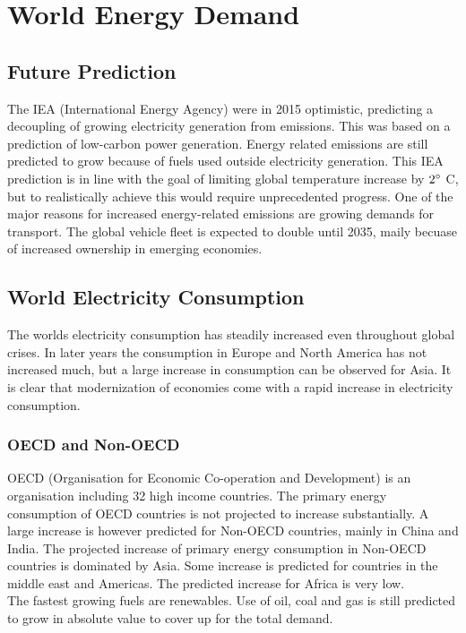 \section{World Energy Demand}

\subsection{Future Prediction}
The IEA (International Energy Agency) were in 2015 optimistic, predicting a decoupling of growing electricity generation from \cotwo emissions.
This was based on a prediction of low-carbon power generation.
Energy related \cotwo emissions are still predicted to grow because of fuels used outside electricity generation.
This IEA prediction is in line with the goal of limiting global temperature increase by $2\degree$ C, but to realistically achieve this would require unprecedented progress.
One of the major reasons for increased energy-related \cotwo emissions are growing demands for transport.
The global vehicle fleet is expected to double until 2035, maily becuase of increased ownership in emerging economies.

\subsection{World Electricity Consumption}
The worlds electricity consumption has steadily increased even throughout global crises.
In later years the consumption in Europe and North America has not increased much, but a large increase in consumption can be observed for Asia.
It is clear that modernization of economies come with a rapid increase in electricity consumption.

\subsubsection{OECD and Non-OECD}
OECD (Organisation for Economic Co-operation and Development) is an organisation including 32 high income countries.
The primary energy consumption of OECD countries is not projected to increase substantially.
A large increase is however predicted for Non-OECD countries, mainly in China and India.
The projected increase of primary energy consumption in Non-OECD countries is dominated by Asia.
Some increase is predicted for countries in the middle east and Americas.
The predicted increase for Africa is very low.\\

The fastest growing fuels are renewables.
Use of oil, coal and gas is still predicted to grow in absolute value to cover up for the total demand.

